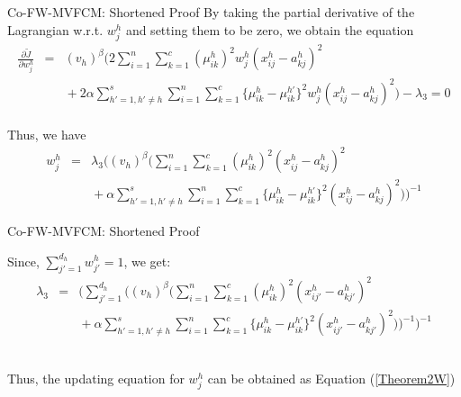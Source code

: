 \documentclass[compress,sky blue]{beamer}
\begin{document}
\begin{frame}{Co-FW-MVFCM: Shortened Proof}
\vspace{-0.6cm}
By taking the partial derivative of the Lagrangian w.r.t. $w_{j}^{h}$  and setting them to be zero, we obtain the equation  
\begin{eqnarray*}
 \scriptstyle \frac{\partial \tilde{J}}{\partial w_{j}^{h}} &\scriptstyle =&\scriptstyle (v_{h})^{\beta}\big (2 \sum_{i=1}^{n}\sum_{k=1}^{c} (\mu_{ik}^{h})^{2} w_{j}^{h} (x_{ij}^{h}-a_{kj}^{h})^{2}\\
 &&  {} \scriptstyle + 2 \alpha \sum_{h'=1,h'\neq h}^{s} \sum_{i=1}^{n}\sum_{k=1}^{c} \{ \mu_{ik}^{h}-\mu_{ik}^{h'} \}^{2}  w_{j}^{h} (x_{ij}^{h}-a_{kj}^{h})^{2} \big) - \lambda_{3}=0
\end{eqnarray*}
\\Thus, we have
\begin{eqnarray*} 
\scriptstyle w_{j}^{h} &\scriptstyle =&\scriptstyle \lambda_{3} \Big ((v_{h})^{\beta}\big ( \sum_{i=1}^{n}\sum_{k=1}^{c} (\mu_{ik}^{h})^{2}  (x_{ij}^{h}-a_{kj}^{h})^{2}\\
  &&  {} \scriptstyle + \alpha \sum_{h'=1,h'\neq h}^{s} \sum_{i=1}^{n}\sum_{k=1}^{c} \{ \mu_{ik}^{h}-\mu_{ik}^{h'} \}^{2}  (x_{ij}^{h}-a_{kj}^{h})^{2} \big)\Big)^{-1}
\end{eqnarray*}
\end{frame}

\begin{frame}{Co-FW-MVFCM: Shortened Proof}
\vspace{-0.6cm}

Since, $\sum_{j'=1}^{d_{h}}w_{j'}^{h}=1 $, we get: \\

\begin{eqnarray*} 
\lambda_{3}  &=& \bigg ( \sum_{j'=1}^{d_{h}}\Big ((v_{h})^{\beta}\big ( \sum_{i=1}^{n}\sum_{k=1}^{c} (\mu_{ik}^{h})^{2}  (x_{ij'}^{h}-a_{kj'}^{h})^{2}\\
  &&  {} + \alpha \sum_{h'=1,h'\neq h}^{s} \sum_{i=1}^{n}\sum_{k=1}^{c} \{ \mu_{ik}^{h}-\mu_{ik}^{h'} \}^{2} (x_{ij'}^{h}-a_{kj'}^{h})^{2} \big)\Big)^{-1} \bigg)^{-1}
\end{eqnarray*}

\\ Thus, the updating equation for $w_{j}^{h}$ can be obtained as Equation (\ref{Theorem2W}) 

\end{frame}
\end{document}
